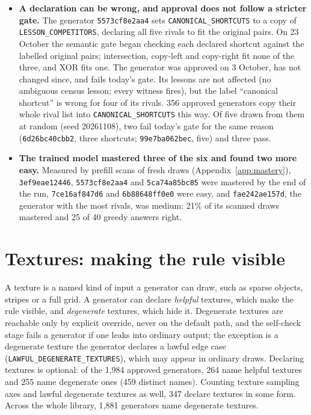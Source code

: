 \documentclass[11pt]{article}
\newcommand{\gen}[1]{\texttt{#1}}
\begin{document}
\begin{itemize}[nosep]
  \item \textbf{A declaration can be wrong, and approval does not follow a stricter gate.} The generator \gen{5573cf8e2aa4} sets \texttt{CANONICAL\_SHORTCUTS} to a copy of \texttt{LESSON\_COMPETITORS}, declaring all five rivals to fit the original pairs. On 23 October the semantic gate began checking each declared shortcut against the labelled original pairs; intersection, copy-left and copy-right fit none of the three, and XOR fits one. The generator was approved on 3 October, has not changed since, and fails today's gate. Its lessons are not affected (no ambiguous census lesson; every witness fires), but the label ``canonical shortcut'' is wrong for four of its rivals. 356 approved generators copy their whole rival list into \texttt{CANONICAL\_SHORTCUTS} this way. Of five drawn from them at random (seed 20261108), two fail today's gate for the same reason (\gen{6d26bc40cbb2}, three shortcuts; \gen{99e7ba062bec}, five) and three pass.
  \item \textbf{The trained model mastered three of the six and found two more easy.} Measured by prefill scans of fresh draws (Appendix~\ref{app:mastery}), \gen{3ef9eae12446}, \gen{5573cf8e2aa4} and \gen{5ca74a85bc85} were mastered by the end of the run, \gen{7ce16af847d6} and \gen{6b88648ff0e0} were easy, and \gen{fae242ae157d}, the generator with the most rivals, was medium: 21\% of its scanned draws mastered and 25 of 40 greedy answers right.
\end{itemize}



\section{Textures: making the rule visible}
\label{sec:textures}

A texture is a named kind of input a generator can draw, such as sparse
objects, stripes or a full grid. A generator can declare \emph{helpful}
textures, which make the rule visible, and \emph{degenerate} textures, which
hide it. Degenerate textures are reachable only by explicit override, never on
the default path, and the self-check stage fails a generator if one leaks into
ordinary output; the exception is a degenerate texture the generator declares a
lawful edge case (\texttt{LAWFUL\_DEGENERATE\_TEXTURES}), which may appear in
ordinary draws. Declaring textures is optional: of the 1,984 approved
generators, 264 name helpful textures and 255 name degenerate ones (459
distinct names). Counting texture sampling axes and lawful degenerate
textures as well, 347 declare textures in some form. Across the whole library, 1,881
generators name degenerate textures.
\end{document}

